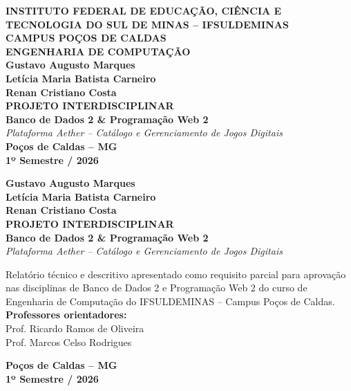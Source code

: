 \documentclass[12pt,a4paper]{article}
\begin{document}
\begin{titlepage}
    \begin{center}
        \large\textbf{INSTITUTO FEDERAL DE EDUCAÇÃO, CIÊNCIA E TECNOLOGIA DO SUL DE MINAS -- IFSULDEMINAS}\\
        \large\textbf{CAMPUS POÇOS DE CALDAS}\\
        \large\textbf{ENGENHARIA DE COMPUTAÇÃO}\\
        \vfill
        \large\textbf{Gustavo Augusto Marques}\\
        \large\textbf{Letícia Maria Batista Carneiro}\\
        \large\textbf{Renan Cristiano Costa}\\
        \vfill
        \LARGE\textbf{PROJETO INTERDISCIPLINAR}\\
        \Large\textbf{Banco de Dados 2 \& Programação Web 2}\\
        \Large\textit{Plataforma Aether -- Catálogo e Gerenciamento de Jogos Digitais}\\
        \vfill
        \large\textbf{Poços de Caldas -- MG}\\
        \large\textbf{1º Semestre / 2026}
    \end{center}
\end{titlepage}

\begin{titlepage}
    \begin{center}
        \large\textbf{Gustavo Augusto Marques}\\
        \large\textbf{Letícia Maria Batista Carneiro}\\
        \large\textbf{Renan Cristiano Costa}\\
        \vfill
        \LARGE\textbf{PROJETO INTERDISCIPLINAR}\\
        \Large\textbf{Banco de Dados 2 \& Programação Web 2}\\
        \Large\textit{Plataforma Aether -- Catálogo e Gerenciamento de Jogos Digitais}\\
        \vfill
        \hspace{.45\textwidth}
        \begin{minipage}{.5\textwidth}
            \small Relatório técnico e descritivo apresentado como requisito parcial para aprovação nas disciplinas de Banco de Dados 2 e Programação Web 2 do curso de Engenharia de Computação do IFSULDEMINAS -- Campus Poços de Caldas.
            \newline\newline
            \textbf{Professores orientadores:} \\
            Prof. Ricardo Ramos de Oliveira \\
            Prof. Marcos Celso Rodrigues
        \end{minipage}
        \vfill
        \large\textbf{Poços de Caldas -- MG}\\
        \large\textbf{1º Semestre / 2026}
    \end{center}
\end{titlepage}
\end{document}
